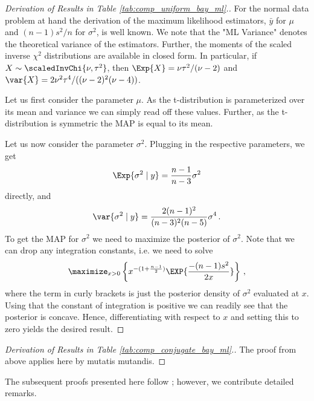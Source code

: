 \begin{proof}[Derivation of Results in Table \ref{tab:comp_uniform_bay_ml}.]
  For the normal data problem at hand the derivation of the maximum likelihood estimators, $\bar{y}$ for $\mu$ and $(n-1) s^2 / n$ for $\sigma^2$, is well known.
  We note that the "ML Variance" denotes the theoretical variance of the estimators.
  Further, the moments of the scaled inverse $\chi^2$ distributions are available in closed form.
  In particular, if $X \sim \scaledInvChi{\nu, \tau^2}$, then $\Exp{X} = \nu \tau^2 / (\nu - 2)$ and $\var{X} = 2 \nu^2 \tau^4 / ((\nu - 2)^2 (\nu - 4))$.

  Let us first consider the parameter $\mu$.
  As the t-distribution is parameterized over its mean and variance we can simply read off these values.
  Further, as the t-distribution is symmetric the MAP is equal to its mean.

  Let us now consider the parameter $\sigma^2$.
  Plugging in the respective parameters, we get
  \begin{align*}
    \Exp{\sigma^2 \mid y} = \frac{n - 1}{n - 3} \sigma^2
  \end{align*}
  directly, and
  \begin{align*}
    \var{\sigma^2 \mid y} = \frac{2 (n-1)^2}{(n-3)^2(n-5)} \sigma^4 \,.
  \end{align*}
  To get the MAP for $\sigma^2$ we need to maximize the posterior of $\sigma^2$.
  Note that we can drop any integration constants, i.e. we need to solve
  \begin{align*}
    \maximize_{x > 0} \left\{x^{-(1 + \frac{n-1}{2})} \EXP{\frac{-(n-1) s^2}{2 x}}\right\} \,,
  \end{align*}
  where the term in curly brackets is just the posterior density of $\sigma^2$ evaluated at $x$.
  Using that the constant of integration is positive we can readily see that the posterior is concave.
  Hence, differentiating with respect to $x$ and setting this to zero yields the desired result.
\end{proof}

\begin{proof}[Derivation of Results in Table \ref{tab:comp_conjugate_bay_ml}.]
  The proof from above applies here by mutatis mutandis.
\end{proof}

\begin{remark}
The subsequent proofs presented here follow \citet{gelmanbda04}; however, we contribute detailed remarks.
\end{remark}

